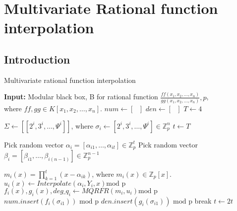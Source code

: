 \chapter{Multivariate Rational function interpolation}
\section{Introduction}

\setK
\begin{algorithm}
    \caption{Multivariate rational function interpolation}
    \begin{algorithmic}[1]
      \State \textbf{Input:} Modular black box, B for rational function $\frac{ff(x_{1}, x_2, \dots, x_n)}{gg(x_1, x_2, \dots, x_n)}, p$,\\
       where $ff,gg \in K[x_1, x_2, \dots, x_n]$.
      \State $num \gets [ \text{  }]$
      \State $den \gets [\text{  }  ]$
      \State $T \gets 4$\
      
      \State $\Sigma \gets [[2^i,3^i,\dots, \Psi^{i}]]$, where $\sigma_{i} \gets [2^i,3^i,\dots, \Psi^{i}] \in \mathbb{Z}^{n}_{p}$
      \State $t \gets T$

      \State Pick random vector $\alpha_{i} =[\alpha_{i1},\dots,\alpha_{it}] \in \mathbb{Z}^{t}_{p}$
      \State Pick random vector $\beta_{i}=[\beta_{i1},\dots,\beta_{i(n-1)}] \in \mathbb{Z}^{n-1}_{p}$
     
      \State $m_{i}(x)=\prod_{k=1}^{t} (x-\alpha_{ik})$, where $m_{i}(x) \in \mathbb{Z}_{p}[x]$.
      \State $u_{i}(x) \gets Interpolate(\alpha_{i},Y_{i},x ) \text{mod p}$
      \State $f_{i}(x),g_{i}(x),deg\_q_{i} \gets MQRFR(m_{i},u_{i}) \text{mod p}$
      \State  $num.insert(f_{i}(\sigma_{i1})) \text{ mod p}$
      \State  $den.insert(g_{i}(\sigma_{i1})) \text{ mod p} $
      \State break
      \Else 
        \State $t \gets 2t$
        \EndIf 
      \EndWhile


\end{algorithmic}
\end{algorithm}
